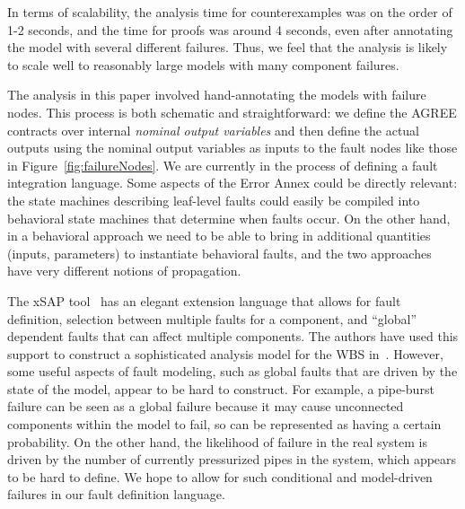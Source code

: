 In terms of scalability, the analysis time for counterexamples was on the order of 1-2 seconds, and the time for proofs was around 4 seconds, even after annotating the model with several different failures.  Thus, we feel that the analysis is likely to scale well to reasonably large models with many component failures.

The analysis in this paper involved hand-annotating the models with failure nodes.  This process is both schematic and straightforward: we define the AGREE contracts over internal {\em nominal output variables} and then define the actual outputs using the nominal output variables as inputs to the fault nodes like those in Figure~\ref{fig:failureNodes}.   We are currently in the process of defining a fault integration language.  Some aspects of the Error Annex could be directly relevant: the state machines describing leaf-level faults could easily be compiled into behavioral state machines that determine when faults occur.  On the other hand, in a behavioral approach we need to be able to bring in additional quantities (inputs, parameters) to instantiate behavioral faults, and the two approaches have very different notions of propagation.

The xSAP tool~\cite{DBLP:conf/tacas/BittnerBCCGGMMZ16} has an elegant extension language that allows for fault definition, selection between multiple faults for a component, and ``global'' dependent faults that can affect multiple components.  The authors have used this support to construct a sophisticated analysis model for the WBS in~\cite{DBLP:conf/cav/BozzanoCPJKPRT15}.  However, some useful aspects of fault modeling, such as global faults that are driven by the state of the model, appear to be hard to construct.  For example, a pipe-burst failure can be seen as a global failure because it may cause unconnected components within the model to fail, so can be represented as having a certain probability.  On the other hand, the likelihood of failure in the real system is driven by the number of currently pressurized pipes in the system, which appears to be hard to define.  We hope to allow for such conditional and model-driven failures in our fault definition language.



